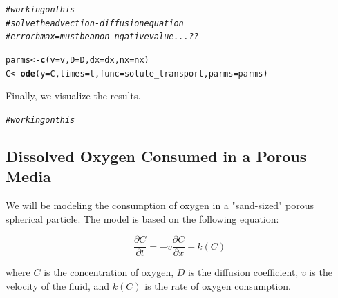 \documentclass{tufte-handout}\usepackage[]{graphicx}\usepackage[]{xcolor}
\makeatletter
\newcommand{\hlcom}[1]{\textcolor[rgb]{0.678,0.584,0.686}{\textit{#1}}}%
\newcommand{\hlstd}[1]{\textcolor[rgb]{0.345,0.345,0.345}{#1}}%
\newcommand{\hlkwb}[1]{\textcolor[rgb]{0.69,0.353,0.396}{#1}}%
\newcommand{\hlkwc}[1]{\textcolor[rgb]{0.333,0.667,0.333}{#1}}%
\newcommand{\hlkwd}[1]{\textcolor[rgb]{0.737,0.353,0.396}{\textbf{#1}}}%
\newenvironment{kframe}{%
 \def\at@end@of@kframe{}%
 \ifinner\ifhmode%
  \def\at@end@of@kframe{\end{minipage}}%
  \begin{minipage}{\columnwidth}%
 \fi\fi%
 \def\FrameCommand##1{\hskip\@totalleftmargin \hskip-\fboxsep
 \colorbox{shadecolor}{##1}\hskip-\fboxsep
     \hskip-\linewidth \hskip-\@totalleftmargin \hskip\columnwidth}%
 \MakeFramed {\advance\hsize-\width
   \@totalleftmargin\z@ \linewidth\hsize
   \@setminipage}}%
 {\par\unskip\endMakeFramed%
 \at@end@of@kframe}
\newenvironment{knitrout}{}{} %
\makeatother
\begin{document}
\begin{knitrout}
\color{fgcolor}\begin{kframe}
\begin{alltt}
\hlcom{# working on this}
\hlcom{# solve the advection-diffusion equation}
\hlcom{# error hmax = must be a non-ngative value... ??}

\hlstd{parms} \hlkwb{<-} \hlkwd{c}\hlstd{(}\hlkwc{v} \hlstd{= v,} \hlkwc{D} \hlstd{= D,} \hlkwc{dx} \hlstd{= dx,} \hlkwc{nx} \hlstd{= nx)}
\hlstd{C} \hlkwb{<-} \hlkwd{ode}\hlstd{(}\hlkwc{y} \hlstd{= C,} \hlkwc{times} \hlstd{= t,} \hlkwc{func} \hlstd{= solute_transport,} \hlkwc{parms} \hlstd{= parms)}
\end{alltt}


{\ttfamily\noindent\color{warningcolor}{\#\# Warning in max(abs(diff(times))): no non-missing arguments to max; returning -Inf}}

{\ttfamily\noindent\bfseries\color{errorcolor}{\#\# Error in checkInput(y, times, func, rtol, atol, jacfunc, tcrit, hmin, : `hmax' must be a non-negative value}}\end{kframe}
\end{knitrout}

Finally, we visualize the results.

\begin{knitrout}
\color{fgcolor}\begin{kframe}
\begin{alltt}
\hlcom{# working on this}
\end{alltt}
\end{kframe}
\end{knitrout}




\subsection{Dissolved Oxygen Consumed in a Porous Media}

We will be modeling the consumption of oxygen in a "sand-sized" porous spherical particle. The model is based on the following equation:

\[ \frac{\partial C}{\partial t} = -v \frac{\partial C}{\partial x} - k(C) \]

where \( C \) is the concentration of oxygen, \( D \) is the diffusion coefficient, \( v \) is the velocity of the fluid, and \( k(C) \) is the rate of oxygen consumption.
\end{document}
